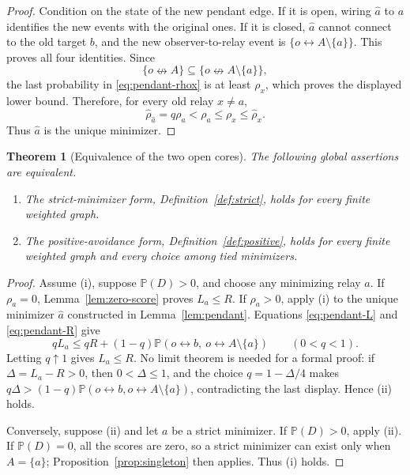 \documentclass[11pt]{article}
\newtheorem{theorem}{Theorem}[section]
\theoremstyle{definition}
\newcommand{\PP}{\mathbb P}
\newcommand{\con}{\leftrightarrow}
\newcommand{\ncon}{\nleftrightarrow}
\newcommand{\1}{\mathbf 1}
\begin{document}
\begin{proof}
Condition on the state of the new pendant edge.  If it is open, wiring
\(\widehat a\) to \(a\) identifies the new events with the original ones.
If it is closed, \(\widehat a\) cannot connect to the old target \(b\), and
the new observer-to-relay event is \(\{o\con A\setminus\{a\}\}\).
This proves all four identities.  Since
\[
 \{o\ncon A\}\subseteq\{o\ncon A\setminus\{a\}\},
\]
the last probability in \eqref{eq:pendant-rhox} is at least \(\rho_x\),
which proves the displayed lower bound.  Therefore, for every old relay
\(x\ne a\),
\[
 \widehat\rho_{\widehat a}=q\rho_a<\rho_a
 \le\rho_x\le\widehat\rho_x.
\]
Thus \(\widehat a\) is the unique minimizer.
\end{proof}

\begin{theorem}[Equivalence of the two open cores]\label{thm:equivalence}
The following global assertions are equivalent.
\begin{enumerate}[label=\textup{(\roman*)}]
\item The strict-minimizer form, Definition~\ref{def:strict}, holds for
every finite weighted graph.
\item The positive-avoidance form, Definition~\ref{def:positive}, holds for
every finite weighted graph and every choice among tied minimizers.
\end{enumerate}
\end{theorem}

\begin{proof}
Assume (i), suppose \(\PP(D)>0\), and choose any minimizing relay \(a\).
If \(\rho_a=0\), Lemma~\ref{lem:zero-score} proves \(L_a\le R\).  If
\(\rho_a>0\), apply (i) to the unique minimizer \(\widehat a\) constructed
in Lemma~\ref{lem:pendant}.  Equations \eqref{eq:pendant-L} and
\eqref{eq:pendant-R} give
\[
 qL_a\le qR+(1-q)\PP(o\con b,\ o\con A\setminus\{a\})
 \qquad(0<q<1).
\]
Letting \(q\uparrow1\) gives \(L_a\le R\).  No limit theorem is needed
for a formal proof: if \(\Delta=L_a-R>0\), then \(0<\Delta\le1\), and the
choice \(q=1-\Delta/4\) makes
\(q\Delta>(1-q)\PP(o\con b,o\con A\setminus\{a\})\), contradicting the
last display.  Hence (ii) holds.

Conversely, suppose (ii) and let \(a\) be a strict minimizer.  If
\(\PP(D)>0\), apply (ii).  If \(\PP(D)=0\), all the scores are zero, so a
strict minimizer can exist only when \(A=\{a\}\); Proposition~\ref{prop:singleton}
then applies.  Thus (i) holds.
\end{proof}
\end{document}
